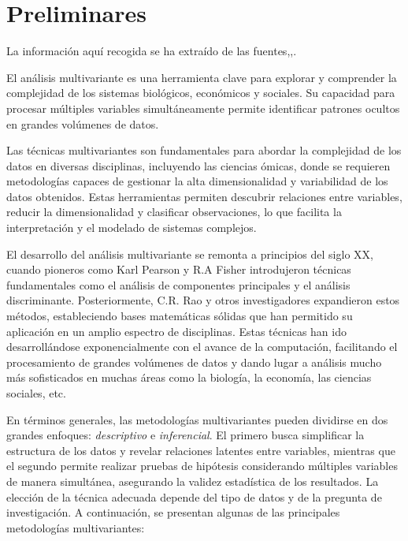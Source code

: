 \section{Preliminares}

La información aquí recogida se ha extraído de las fuentes\cite{hist-mul-1},\cite{hist-mul-2},\cite{Bib-1}. \newline %

El análisis multivariante es una herramienta clave para explorar y comprender la complejidad de los sistemas 
biológicos, económicos y sociales. Su capacidad para procesar múltiples variables simultáneamente permite identificar 
patrones ocultos en grandes volúmenes de datos. \newline

Las técnicas multivariantes son fundamentales para abordar la complejidad de los datos en diversas disciplinas, 
incluyendo las ciencias ómicas, donde se requieren metodologías capaces de gestionar la alta dimensionalidad y 
variabilidad de los datos obtenidos. Estas herramientas permiten descubrir relaciones entre variables, 
reducir la dimensionalidad y clasificar observaciones, lo que facilita la interpretación y el modelado de sistemas 
complejos. \newline



El desarrollo del análisis multivariante se remonta a principios del siglo XX, cuando pioneros como Karl Pearson y R.A
Fisher introdujeron técnicas fundamentales como el análisis de componentes principales y el análisis discriminante.
Posteriormente, C.R. Rao y otros investigadores expandieron estos métodos, estableciendo bases matemáticas sólidas que
han permitido su aplicación en un amplio espectro de disciplinas. Estas técnicas han ido desarrollándose exponencialmente
con el avance de la computación, facilitando el procesamiento de grandes volúmenes de datos y dando lugar a análisis 
mucho más sofisticados en muchas áreas como la biología, la economía, las ciencias sociales, etc. \newline

En términos generales, las metodologías multivariantes pueden dividirse en dos grandes enfoques: \textit{descriptivo}
e \textit{inferencial}. El primero busca simplificar la estructura de los datos y revelar relaciones latentes entre
variables, mientras que el segundo permite realizar pruebas de hipótesis considerando múltiples variables de manera
simultánea, asegurando la validez estadística de los resultados. La elección de la técnica adecuada depende del tipo 
de datos y de la pregunta de investigación. A continuación, se presentan algunas de las principales metodologías multivariantes:

